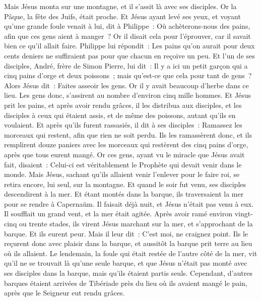 \begin{multicols}{2}
Mais Jésus monta sur une montagne, et il s'assit là avec ses disciples.
Or la Pâque, la fête des Juifs, était proche.
Et Jésus ayant levé ses yeux, et voyant qu'une grande foule venait à lui, dit à Philippe~: Où achèterons-nous des pains, afin que ces gens aient à manger~?
Or il disait cela pour l'éprouver, car il savait bien ce qu'il allait faire.
Philippe lui répondit~: Les pains qu'on aurait pour deux cents deniers ne suffiraient pas pour que chacun en reçoive un peu.
Et l'un de ses disciples, André, frère de Simon Pierre, lui dit~:
Il y a ici un petit garçon qui a cinq pains d'orge et deux poissons~; mais qu'est-ce que cela pour tant de gens~?
Alors Jésus dit~: Faites asseoir les gens. Or il y avait beaucoup d'herbe dans ce lieu. Les gens donc, s'assirent au nombre d'environ cinq mille hommes.
Et Jésus prit les pains, et après avoir rendu grâces, il les distribua aux disciples, et les disciples à ceux qui étaient assis, et de même des poissons, autant qu'ils en voulaient.
Et après qu'ils furent rassasiés, il dit à ses disciples~: Ramassez les morceaux qui restent, afin que rien ne soit perdu.
Ils les ramassèrent donc, et ils remplirent douze paniers avec les morceaux qui restèrent des cinq pains d'orge, après que tous eurent mangé.
Or ces gens, ayant vu le miracle que Jésus avait fait, disaient~: Celui-ci est véritablement le Prophète qui devait venir dans le monde.
Mais Jésus, sachant qu'ils allaient venir l'enlever pour le faire roi, se retira encore, lui seul, sur la montagne.
Et quand le soir fut venu, ses disciples descendirent à la mer.
Et étant montés dans la barque, ils traversaient la mer pour se rendre à Capernaüm. Il faisait déjà nuit, et Jésus n'était pas venu à eux.
Il soufflait un grand vent, et la mer était agitée.
Après avoir ramé environ vingt-cinq ou trente stades, ils virent Jésus marchant sur la mer, et s'approchant de la barque. Et ils eurent peur.
Mais il leur dit~: C'est moi, ne craignez point.
Ils le reçurent donc avec plaisir dans la barque, et aussitôt la barque prit terre au lieu où ils allaient.
Le lendemain, la foule qui était restée de l'autre côté de la mer, vit qu'il ne se trouvait là qu'une seule barque, et que Jésus n'était pas monté avec ses disciples dans la barque, mais qu'ils étaient partis seuls.
Cependant, d'autres barques étaient arrivées de Tibériade près du lieu où ils avaient mangé le pain, après que le Seigneur eut rendu grâces.

\end{multicols}
